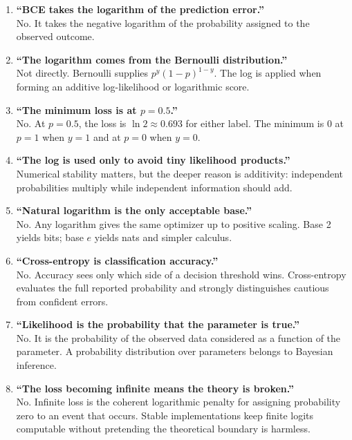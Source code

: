 \documentclass[11pt]{article}
\theoremstyle{definition}
\begin{document}
\begin{enumerate}[label=\textbf{\arabic*.}]
  \item \textbf{``BCE takes the logarithm of the prediction error.''}\\
  No. It takes the negative logarithm of the probability assigned to the observed outcome.

  \item \textbf{``The logarithm comes from the Bernoulli distribution.''}\\
  Not directly. Bernoulli supplies $p^y(1-p)^{1-y}$. The log is applied when forming an additive log-likelihood or logarithmic score.

  \item \textbf{``The minimum loss is at $p=0.5$.''}\\
  No. At $p=0.5$, the loss is $\ln2\approx0.693$ for either label. The minimum is 0 at $p=1$ when $y=1$ and at $p=0$ when $y=0$.

  \item \textbf{``The log is used only to avoid tiny likelihood products.''}\\
  Numerical stability matters, but the deeper reason is additivity: independent probabilities multiply while independent information should add.

  \item \textbf{``Natural logarithm is the only acceptable base.''}\\
  No. Any logarithm gives the same optimizer up to positive scaling. Base 2 yields bits; base $e$ yields nats and simpler calculus.

  \item \textbf{``Cross-entropy is classification accuracy.''}\\
  No. Accuracy sees only which side of a decision threshold wins. Cross-entropy evaluates the full reported probability and strongly distinguishes cautious from confident errors.

  \item \textbf{``Likelihood is the probability that the parameter is true.''}\\
  No. It is the probability of the observed data considered as a function of the parameter. A probability distribution over parameters belongs to Bayesian inference.

  \item \textbf{``The loss becoming infinite means the theory is broken.''}\\
  No. Infinite loss is the coherent logarithmic penalty for assigning probability zero to an event that occurs. Stable implementations keep finite logits computable without pretending the theoretical boundary is harmless.
\end{enumerate}
\end{document}
